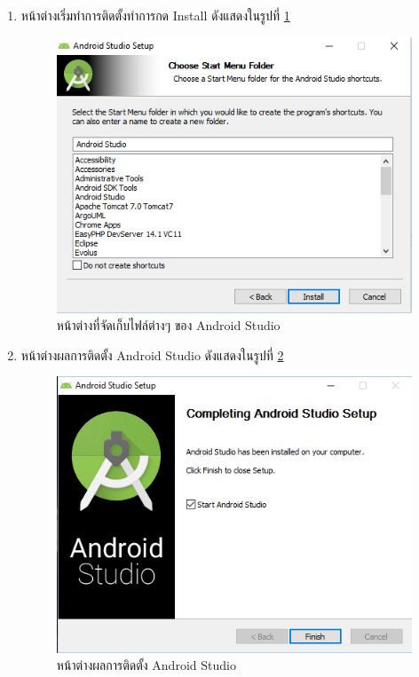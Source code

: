 \begin{enumerate}
	\item  หน้าต่างเริ่มทำการติดตั้งทำการกด Install ดังแสดงในรูปที่ \ref{Fig:android6}
	\begin{figure}[H]
		\centering
		\includegraphics[width=0.7\columnwidth]{Figures/prepareation/android6}
		\caption{หน้าต่างที่จัดเก็บไฟล์ต่างๆ ของ  Android Studio}
		\label{Fig:android6}
	\end{figure}
	
	\item  หน้าต่างผลการติดตั้ง Android Studio ดังแสดงในรูปที่ \ref{Fig:android7}
	\begin{figure}[H]
		\centering
		\includegraphics[width=0.7\columnwidth]{Figures/prepareation/android7}
		\caption{ หน้าต่างผลการติดตั้ง Android Studio}
		\label{Fig:android7}
	\end{figure}
	
\end{enumerate}

